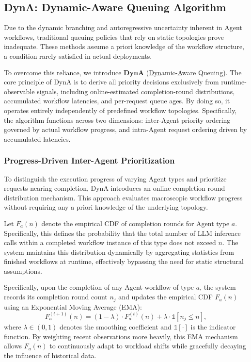\documentclass[sigconf,review,anonymous]{acmart}
\begin{document}
\subsection{DynA: Dynamic-Aware Queuing Algorithm}\label{sec:queue-algorithm}
Due to the dynamic branching and autoregressive uncertainty inherent in Agent 
workflows, traditional queuing policies that rely on static topologies 
prove inadequate. These methods assume a priori knowledge of the workflow structure, 
a condition rarely satisfied in actual deployments.

To overcome this reliance, we introduce \textbf{DynA} 
(\underline{Dyn}amic-\underline{A}ware Queuing). The core principle 
of DynA is to derive all priority decisions exclusively from runtime-observable 
signals, including online-estimated completion-round distributions, accumulated 
workflow latencies, and per-request queue ages. By doing so, it operates entirely 
independently of predefined workflow topologies. Specifically, the algorithm 
functions across two dimensions: inter-Agent priority ordering governed 
by actual workflow progress, and intra-Agent request ordering driven by 
accumulated latencies.

\subsubsection{Progress-Driven Inter-Agent Prioritization}
\label{subsec:inter-agent}

To distinguish the execution progress of varying Agent types and prioritize 
requests nearing completion, DynA introduces an online completion-round distribution 
mechanism. This approach evaluates macroscopic workflow progress without 
requiring any a priori knowledge of the underlying topology.

Let $F_a(n)$ denote the empirical CDF of completion rounds for Agent
type $a$. Specifically, this defines the probability that the total 
number of LLM inference calls within a completed workflow instance of 
this type does not exceed $n$. The system maintains this distribution 
dynamically by aggregating statistics from finished workflows at runtime, 
effectively bypassing the need for static structural assumptions.

Specifically, upon the completion of any Agent workflow of type $a$, the
system records its completion round count $n_j$ and updates the empirical CDF $F_a(n)$
using an Exponential Moving Average (EMA):
\begin{equation}
  \label{eq:ema-update}
  F_a^{(t+1)}(n) = (1-\lambda)\cdot F_a^{(t)}(n) + \lambda\cdot\mathbb{1}[n_j \le n],
\end{equation}
where $\lambda \in (0,1)$ denotes the smoothing coefficient and
$\mathbb{1}[\cdot]$ is the indicator function. By weighting recent 
observations more heavily, this EMA mechanism allows $F_a(n)$ to continuously 
adapt to workload shifts while gracefully decaying the influence of historical data.
\end{document}
